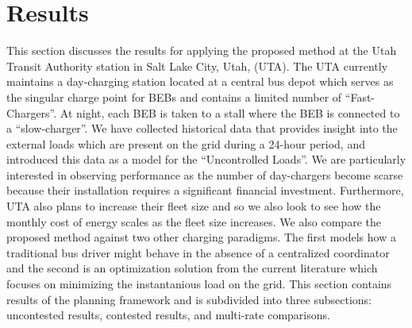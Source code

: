 \section{Results}
This section discusses the results for applying the proposed method at the Utah Transit Authority station in Salt Lake City, Utah, (UTA). The UTA currently maintains a day-charging station located at a central bus depot which serves as the singular charge point for BEBs and contains a limited number of ``Fast-Chargers''.  At night, each BEB is taken to a stall where the BEB is connected to a ``slow-charger''. We have collected historical data that provides insight into the external loads which are present on the grid during a 24-hour period, and introduced this data as a model for the ``Uncontrolled Loads''. We are particularly interested in observing performance as the number of day-chargers become scarse because their installation requires a significant financial investment. Furthermore, UTA also plans to increase their fleet size and so we also look to see how the monthly cost of energy scales as the fleet size increases. We also compare the proposed method against two other charging paradigms.  The first models how a traditional bus driver might behave in the absence of a centralized coordinator and the second is an optimization solution from the current literature which focuses on minimizing the instantanious load on the grid.
This section contains results of the planning framework and is subdivided into three subsections: uncontested results, contested results, and multi-rate comparisons.  
